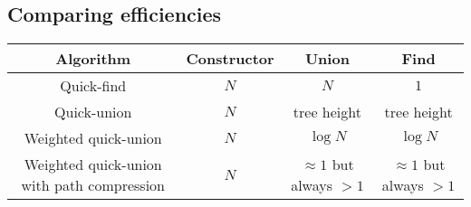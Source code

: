 \documentclass{article}
\begin{document}
\subsection{Comparing efficiencies}
\begin{center}
\begin{tabular}{||c c c c||} 
 \hline
 Algorithm & Constructor & Union & Find \\ [0.5ex] 
 \hline\hline
 Quick-find & $N$ & $N$ & $1$ \\ 
 \hline
 Quick-union & $N$ & tree height & tree height \\
 \hline
 Weighted quick-union & $N$ & $\log{N}$ & $\log{N}$ \\
 \hline
 Weighted quick-union with path compression & $N$ & $\approx{1}$ but always $>1$ & $\approx{1}$ but always $>1$  \\
 \hline
\end{tabular}
\end{center}
\end{document}
